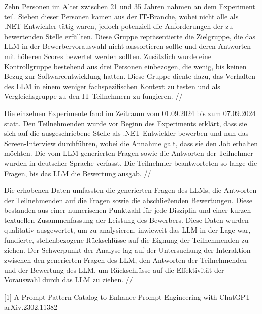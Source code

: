 Zehn Personen im Alter zwischen 21 und 35 Jahren nahmen an dem Experiment teil. 
Sieben dieser Personen kamen aus der IT-Branche, wobei nicht alle als .NET-Entwickler tätig waren, 
jedoch potenziell die Anforderungen der zu bewertenden Stelle erfüllten. Diese Gruppe 
repräsentierte die Zielgruppe, die das LLM in der Bewerbervorauswahl nicht aussortieren sollte und 
deren Antworten mit höheren Scores bewertet werden sollten. Zusätzlich wurde eine Kontrollgruppe 
bestehend aus drei Personen einbezogen, die wenig, bis keinen Bezug zur Softwareentwicklung hatten. 
Diese Gruppe diente dazu, das Verhalten des LLM in einem weniger fachspezifischen Kontext zu 
testen und als Vergleichsgruppe zu den IT-Teilnehmern zu fungieren. //


Die einzelnen Experimente fand im Zeitraum vom 01.09.2024 bis zum 07.09.2024 statt. Den 
Teilnehmenden wurde vor Beginn des Experiments erklärt, dass sie sich auf die ausgeschriebene 
Stelle als .NET-Entwickler bewerben und nun das Screen-Interview durchführen, wobei die Annahme 
galt, dass sie den Job erhalten möchten. Die vom LLM generierten Fragen sowie die Antworten der 
Teilnehmer wurden in deutscher Sprache verfasst. Die Teilnehmer beantworteten so lange die Fragen, 
bis das LLM die Bewertung ausgab. //


Die erhobenen Daten umfassten die generierten Fragen des LLMs, die Antworten der Teilnehmenden auf 
die Fragen sowie die abschließenden Bewertungen. Diese bestanden aus einer numerischen Punktzahl 
für jede Disziplin und einer kurzen textuellen Zusammenfassung der Leistung des Bewerbers. 
Diese Daten wurden qualitativ ausgewertet, um zu analysieren, inwieweit das LLM in der Lage war, 
fundierte, stellenbezogene Rückschlüsse auf die Eignung der Teilnehmenden zu ziehen. Der 
Schwerpunkt der Analyse lag auf der Untersuchung der Interaktion zwischen den generierten Fragen 
des LLM, den Antworten der Teilnehmenden und der Bewertung des LLM, um Rückschlüsse auf die 
Effektivität der Vorauswahl durch das LLM zu ziehen. //


[1] A Prompt Pattern Catalog to Enhance Prompt Engineering with ChatGPT
arXiv.2302.11382







